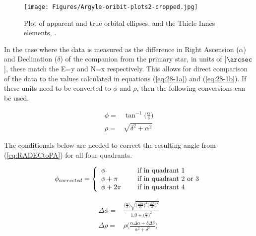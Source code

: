 \documentclass[12pt,preprint]{aastex}
\begin{document}
\begin{figure}[ht]
\begin{center}
\texttt{[image: Figures/Argyle-oribit-plots2-cropped.jpg]}
\caption[Apparent and True orbital ellipses]{ Plot of apparent and true orbital ellipses, and the Thiele-Innes elements, \citet{Argyle}. }
\label{fig:apparentTrueEllipses}
\end{center}
\end{figure}

In the case where the data is measured as the difference in Right Ascension ($\alpha$) and Declination ($\delta$) of the companion from the primary star, in units of [$\arcsec$], these match the E=y and N=x respectively.  This allows for direct comparison of the data to the values calculated in equations  (\ref{eq:28-1a}) and (\ref{eq:28-1b}).  If these units need to be converted to $\phi$ and $\rho$, then the following conversions can be used.

\begin{subequations}
\begin{align}\label{eq:RADECtoPA}
\phi =&   \tan^{-1}\bigg(\frac{\alpha}{\delta} \bigg)\\
\label{eq:RADECtoSA}
\rho =&   \sqrt{\delta^2+\alpha^2}
\end{align}
\end{subequations}

The conditionals below are needed to correct the resulting angle from (\ref{eq:RADECtoPA}) for all four quadrants.

\begin{equation}\label{eq:4.1.PAcorrection}
\phi_{corrected} = \left\{ \begin{array}{l l l} \phi& \quad \text{ if in quadrant 1}\\ \phi + \pi& \quad \text{ if in quadrant 2 or 3}\\ \phi + 2\pi& \quad \text{ if in quadrant 4}  \end{array} \right.
\end{equation}

\begin{subequations}
\begin{align}\label{eq:RADECtoPAerr}
\Delta\phi =&   \frac{\bigg(\frac{\alpha}{\delta}\bigg) \sqrt{\bigg( \frac{\Delta\alpha}{\alpha} \bigg)^2 \bigg( \frac{\Delta\delta}{\delta} \bigg)^2} }{1.0+\bigg(\frac{\alpha}{\delta} \bigg)^2}\\
\label{eq:RADECtoSAerr}
\Delta\rho =&   \rho\Bigg(\frac{\alpha\Delta\alpha + \delta\Delta\delta}{\alpha^2 + \delta^2} \Bigg)
\end{align}
\end{subequations}
\end{document}
